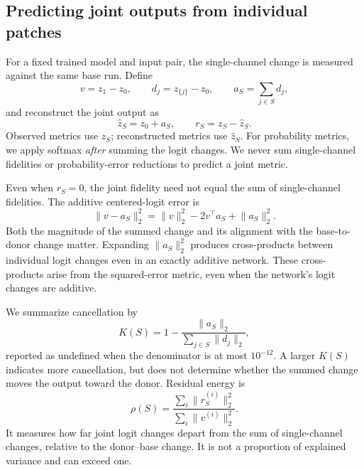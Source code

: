 \documentclass[pdflatex,sn-basic]{sn-jnl}
\begin{document}
\subsection{Predicting joint outputs from individual patches}

For a fixed trained model and input pair, the single-channel change is measured against the same base run. Define
\begin{equation}
v=z_1-z_0,\qquad d_j=z_{\{j\}}-z_0,\qquad
a_S=\sum_{j\in S}d_j,
\label{eq:singleton-changes}
\end{equation}
and reconstruct the joint output as
\begin{equation}
\widehat z_S=z_0+a_S,\qquad r_S=z_S-\widehat z_S.
\label{eq:additive}
\end{equation}
Observed metrics use $z_S$; reconstructed metrics use $\widehat z_S$. For probability metrics, we apply softmax \emph{after} summing the logit changes. We never sum single-channel fidelities or probability-error reductions to predict a joint metric.

Even when $r_S=0$, the joint fidelity need not equal the sum of single-channel fidelities. The additive centered-logit error is
\begin{equation}
\lVert v-a_S\rVert_2^2
=\lVert v\rVert_2^2-2v^\top a_S+\lVert a_S\rVert_2^2.
\label{eq:additive-geometry}
\end{equation}
Both the magnitude of the summed change and its alignment with the base-to-donor change matter. Expanding $\lVert a_S\rVert_2^2$ produces cross-products between individual logit changes even in an exactly additive network. These cross-products arise from the squared-error metric, even when the network's logit changes are additive.

We summarize cancellation by
\begin{equation}
K(S)=1-\frac{\lVert a_S\rVert_2}
                 {\sum_{j\in S}\lVert d_j\rVert_2},
\label{eq:cancellation}
\end{equation}
reported as undefined when the denominator is at most $10^{-12}$. A larger $K(S)$ indicates more cancellation, but does not determine whether the summed change moves the output toward the donor. Residual energy is
\begin{equation}
\rho(S)=\frac{\sum_i\lVert r_S^{(i)}\rVert_2^2}
                  {\sum_i\lVert v^{(i)}\rVert_2^2}.
\label{eq:residual-energy}
\end{equation}
It measures how far joint logit changes depart from the sum of single-channel changes, relative to the donor--base change. It is not a proportion of explained variance and can exceed one.
\end{document}
